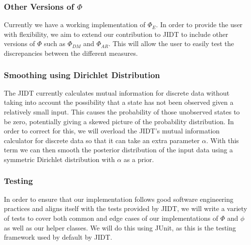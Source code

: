 \documentclass[a4paper,11pt]{article}
\begin{document}
\subsubsection{Other Versions of $\Phi$}
Currently we have a working implementation of $\Phi_{E}$. In order to provide the user with flexibility, we aim to extend our contribution to JIDT to include other versions of $\Phi$ such as $\Phi_{DM}$ and $\Phi_{AR}$. This will allow the user to easily test the discrepancies between the different measures.

\subsubsection{Smoothing using Dirichlet Distribution}
The JIDT currently calculates mutual information for discrete data without taking into account the possibility that a state has not been observed given a relatively small input. This causes the probability of those unobserved states to be zero, potentially giving a skewed picture of the probability distribution. In order to correct for this, we will overload the JIDT's mutual information calculator for discrete data so that it can take an extra parameter $\alpha$. With this term we can then smooth the posterior distribution of the input data using a symmetric Dirichlet distribution with $\alpha$ as a prior.

\subsubsection{Testing}
In order to ensure that our implementation follows good software engineering practices and aligns itself with the tests provided by JIDT, we will write a variety of tests to cover both common and edge cases of our implementations of $\Phi$ and $\phi$ as well as our helper classes. We will do this using JUnit, as this is the testing framework used by default by JIDT.


\clearpage
{}

\clearpage
\end{document}
